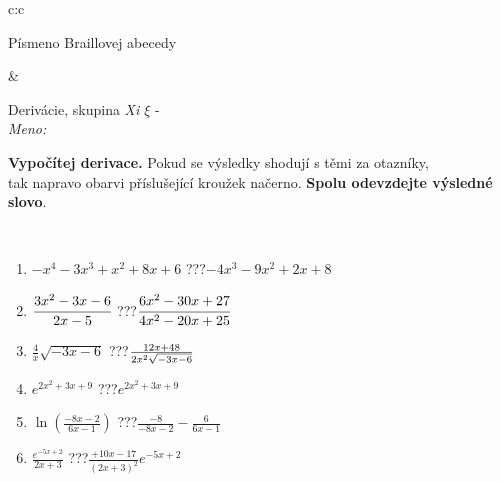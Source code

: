\documentclass[10pt]{report}
\begin{document}
\begin{tabular}{c:c}
\begin{minipage}[c][104.5mm][t]{0.5\linewidth}
\begin{center}
\begin{minipage}{0.20\linewidth}
\begin{center}
{\small Písmeno Braillovej abecedy}
\end{center}
\end{minipage}
\end{center}
\end{minipage}
&
\begin{minipage}[c][104.5mm][t]{0.5\linewidth}
\begin{center}
\vspace{7mm}
{\huge Derivácie, skupina \textit{Xi $\xi$} -}\\[5mm]
\textit{Meno:}\phantom{xxxxxxxxxxxxxxxxxxxxxxxxxxxxxxxxxxxxxxxxxxxxxxxxxxxxxxxxxxxxxxxxx}\\[5mm]
\begin{minipage}{0.95\linewidth}
\begin{center}
\textbf{Vypočítej derivace.} Pokud se výsledky shodují s těmi za otazníky,\\tak napravo obarvi příslušející kroužek načerno. \textbf{Spolu odevzdejte výsledné slovo}.
\end{center}
\end{minipage}
\\[1mm]
\begin{minipage}{0.79\linewidth}
\begin{center}
\begin{varwidth}{\linewidth}
\begin{enumerate}
\normalsize
\item $-x^4-3x^3+x^2+8x+6$\quad \dotfill\; ???\;\dotfill \quad $-4x^3-9x^2+2x+8$
\item $\cfrac{3x^2-3x-6}{2x-5}$\quad \dotfill\; ???\;\dotfill \quad $\cfrac{6x^2-30x+27}{4x^2-20x+25}$
\item $\frac{4}{x}\sqrt{-3x-6}$\quad \dotfill\; ???\;\dotfill \quad $\frac{12x+48}{2x^2 \sqrt{\smash[b]{-3x-6}}}$
\item $e^{2x^2+3x+9}$\quad \dotfill\; ???\;\dotfill \quad $e^{2x^2+3x+9}$
\item $\ln{\left(\frac{-8x-2}{6x-1}\right)}$\quad \dotfill\; ???\;\dotfill \quad $\frac{-8}{-8x-2}-\frac{6}{6x-1}$
\item $\frac{e^{-5x+2}}{2x+3}$\quad \dotfill\; ???\;\dotfill \quad $\frac{+10x-17}{(2x+3)^2}e^{-5x+2}$
\end{enumerate}
\end{varwidth}
\end{center}
\end{minipage}
\begin{minipage}{0.20\linewidth}
\begin{center}

\end{center}
\end{minipage}
\end{center}
\end{minipage}
\end{tabular}
\end{document}

